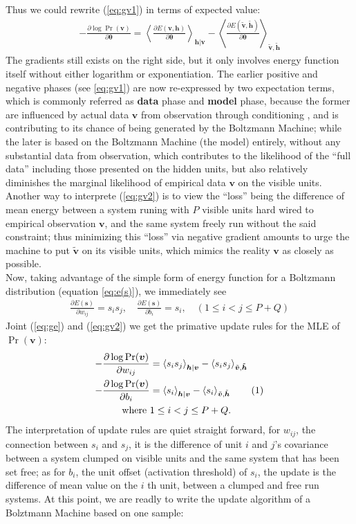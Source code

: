 \documentclass[11pt]{article}
\newcommand{\mean}[2]{\left\langle{#1}\right\rangle_{#2}}
\newcommand\numberthis{\addtocounter{equation}{1}\tag{\theequation}}
\newcommand{\vh}{\boldsymbol{h}}
\newcommand{\vv}{\boldsymbol{v}}
\newcommand{\vs}{\boldsymbol{s}}
\newcommand{\vht}{\tilde{\vh}}
\newcommand{\vvt}{\tilde{\vv}}
\newcommand{\pEC}{\boldsymbol{\theta}}
\newcommand{\PDV}[2]{\frac{\partial #1}{\partial #2}}
\begin{document}
Thus we could rewrite ({\ref{eq:gv1}) in terms of expected value:
\begin{align} \label{eq:gv2}
  -\PDV{\log{\Pr(\vv)}}{\pEC} = \mean{\PDV{E(\vv, \vh)}{\pEC}}{\vh|\vv} - \mean{\PDV{E(\vvt, \vht)}{\pEC}}{\vvt, \vht}
\end{align}
The gradients still exists on the right side, but it only involves energy function itself without either logarithm or exponentiation. The earlier positive and negative phases (see \ref{eq:gv1}) are now re-expressed by two expectation terms, which is commonly referred as \textbf{data} phase and \textbf{model} phase, because the former are influenced by actual data $\vv$ from observation through conditioning , and is contributing to its chance of being generated by the Boltzmann Machine; while the later is based on the Boltzmann Machine (the model) entirely, without any substantial data from observation, which contributes to the likelihood of the ``full data'' including those presented on the hidden units, but also relatively diminishes the marginal likelihood of empirical data $\vv$ on the visible units. \\
Another way to interprete (\ref{eq:gv2}) is to view the ``loss'' being the difference of mean energy between a system runing with $P$ visible units hard wired to empirical observation $\vv$, and the same system freely run without the said constraint; thus minimizing this ``loss'' via negative gradient amounts to urge the machine to put $\vvt$ on its visible units, which mimics the reality $\vv$ as closely as possible. \\
Now, taking advantage of the simple form of energy function for a Boltzmann distribution (equation \ref{eq:e(s)}), we immediately see
\begin{align} \label{eq:ge}
  \PDV{E(\vs)}{w_{ij}} = s_i s_j,  \quad \PDV{E(\vs)}{b_i} = s_i, \quad  (1 \le i < j \le P+Q)
\end{align}
Joint (\ref{eq:ge}) and (\ref{eq:gv2}) we get the primative update rules for the MLE of $\Pr(\vv)$:
\begin{align*} \label{eq:gv3}
  -\PDV{\log{\Pr(\vv)}}{w_{ij}} &= \mean{s_i s_j}{\vh|\vv} - \mean{s_i s_j}{\vvt, \vht} \\
  -\PDV{\log{\Pr(\vv)}}{b_i}    &= \mean{s_i}{\vh|\vv} - \mean{s_i}{\vvt, \vht} \numberthis \\
  \textrm{where }               & 1 \le i < j \le P+Q.
\end{align*}
The interpretation of update rules are quiet straight forward, for $w_{ij}$, the connection between $s_i$ and $s_j$, it is the difference of unit $i$ and $j$'s covariance between a system clumped on visible units and the same system that has been set free; as for $b_i$, the unit offset (activation threshold) of $s_i$, the update is the difference of mean value on the $i$ th unit, between a clumped and free run systems. At this point, we are readly to write the update algorithm of a Bolztmann Machine based on one sample:
}
\end{document}
